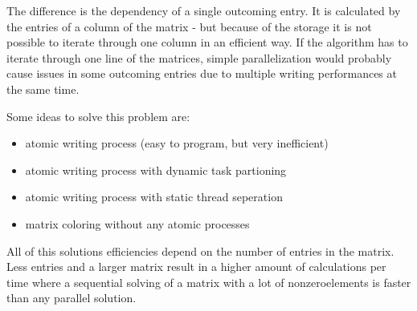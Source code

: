 \documentclass[a4paper,11pt]{scrartcl}
\begin{document}
The difference is the dependency of a single outcoming entry. It is calculated
 by the entries of a column of the matrix - but because of the storage it is not
possible to iterate through one column in an efficient way. If the algorithm 
has to iterate through one line of the matrices, simple parallelization would
probably cause issues in some outcoming entries due to multiple writing
performances at the same time. 

Some ideas to solve this problem are:

\begin{itemize}

\item atomic writing process (easy to program, but very inefficient)
\item atomic writing process with dynamic task partioning
\item atomic writing process with static thread seperation
\item matrix coloring without any atomic processes

\end{itemize} 

All of this solutions efficiencies depend on the number of entries in the matrix.
Less entries and a larger matrix result in a higher amount of calculations per
 time where a sequential solving of a matrix with a lot of nonzeroelements is
 faster than any parallel solution.
\end{document}
